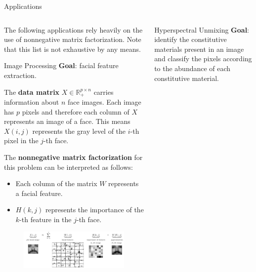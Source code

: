 \documentclass[final]{beamer}
\newlength{\onecolwid}
\newlength{\threecolwid}
\newcommand{\real}{\mathbb{R}}
\begin{document}
\begin{frame}
\begin{columns}[t]
\begin{column}{\threecolwid}
\begin{exampleblock}{Applications}
\vspace{-0.8cm}
\begin{columns}[t]
\begin{column}{\onecolwid}

The following applications rely heavily on the use of nonnegative matrix factorization.
Note that this list is not exhaustive by any means.

\vspace{0.3cm}

\begin{block}{Image Processing}
\textbf{Goal}: facial feature extraction.

The \textbf{data matrix} $X\in\real^{p\times n}_+$ carries information about $n$ face images. Each image has $p$ pixels and therefore each column of $X$ represents an image of a face.
This means $X(i, j)$ represents the gray level of the $i$-th pixel in the $j$-th face.

The \textbf{nonnegative matrix factorization} for this problem can be interpreted as follows:
\begin{itemize}
    \item Each column of the matrix $W$ represents a facial feature.
    \item $H(k, j)$ represents the importance of the $k$-th feature in the $j$-th face.
\end{itemize}
\begin{figure}
    \centering
    \includegraphics{../images/NMF_app1.png}
\end{figure}
\end{block}
\end{column}
\begin{column}{\onecolwid}

\begin{block}{Hyperspectral Unmixing}
\textbf{Goal}: identify the constitutive materials present in an image and classify the pixels according to the abundance of each constitutive material.


\end{block}
\end{column}
\end{columns}
\end{exampleblock}
\end{column}
\end{columns}
\end{frame}
\end{document}
